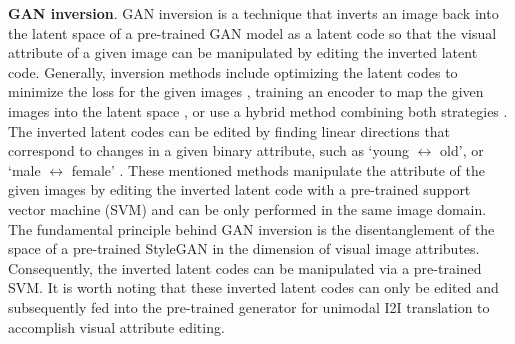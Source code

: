 	\textbf{GAN inversion}. GAN inversion \cite{zhu2020domain,richardson2021encoding,tov2021designing,xia2022gan} is a technique that inverts an image back into the latent space of a pre-trained GAN model as a latent code so that the visual attribute of a given image can be manipulated by editing the inverted latent code. Generally, inversion methods include optimizing the latent codes to minimize the loss for the given images \cite{tewari2020stylerig}, training an encoder to map the given images into the latent space  \cite{zhu2020domain,richardson2021encoding,tov2021designing}, or use a  hybrid method combining both strategies \cite{bau2019seeing}. The inverted latent codes can be edited by finding linear directions that correspond to changes in a given binary attribute, such as `young $\leftrightarrow$ old', or `male $\leftrightarrow$ female' \cite{zhu2020domain,richardson2021encoding,tov2021designing}. These mentioned methods manipulate the attribute of the given images by editing the inverted latent code with a pre-trained support vector machine (SVM)  \cite{shen2020interfacegan} and can be only performed in the same image domain. The fundamental principle behind GAN inversion is the disentanglement of the space of a pre-trained StyleGAN in the dimension of visual image attributes. Consequently, the inverted latent codes can be manipulated via a pre-trained SVM. It is worth noting that these inverted latent codes can only be edited and subsequently fed into the pre-trained generator for unimodal I2I translation to accomplish visual attribute editing.
	

